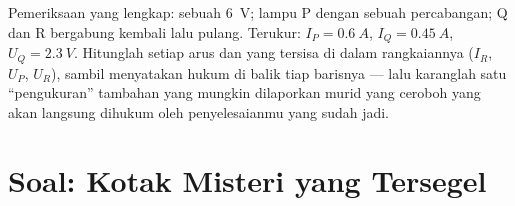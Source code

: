 \begin{exercise}[$\star\star\star$]\label{exo:g8:circuit-laws:12}
Pemeriksaan yang lengkap: sebuah  \qty{6}{V}; lampu P  dengan sebuah percabangan;  Q dan R bergabung kembali lalu
pulang. Terukur: $I_P = \qty{0.6}{A}$, $I_Q = \qty{0.45}{A}$,
$U_Q = \qty{2.3}{V}$. Hitunglah setiap arus dan  yang tersisa
di dalam rangkaiannya ($I_R$, $U_P$, $U_R$), sambil menyatakan hukum
di balik tiap barisnya --- lalu karanglah satu ``pengukuran'' tambahan
yang mungkin dilaporkan murid yang ceroboh yang akan langsung
dihukum oleh penyelesaianmu yang sudah jadi.
\end{exercise}

\section{Soal: Kotak Misteri yang Tersegel}

